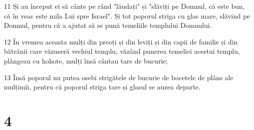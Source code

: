 \par 11 Și au început ei să cânte pe rând "lăudați" și "slăviți pe Domnul, că este bun, că în veac este mila Lui spre Israel". Și tot poporul striga cu glas mare, slăvind pe Domnul, pentru că a ajutat să se pună temeliile templului Domnului.
\par 12 În vremea aceasta mulți din preoți și din leviți și din capii de familie și din bătrânii care văzuseră vechiul templu, văzând punerea temeliei acestui templu, plângeau cu hohote, mulți însă cântau tare de bucurie;
\par 13 Însă poporul nu putea osebi strigătele de bucurie de bocetele de plâns ale mulțimii, pentru că poporul striga tare și glasul se auzea departe.

\chapter{4}

